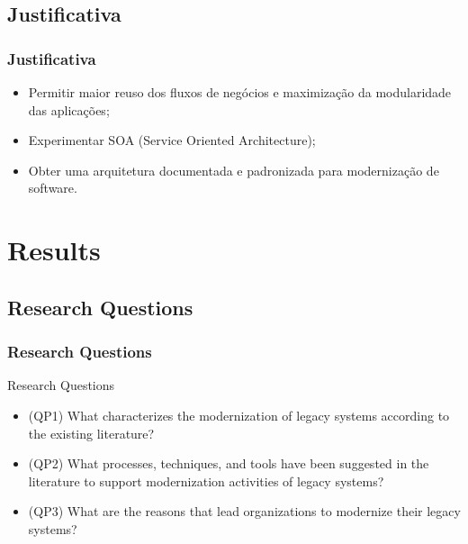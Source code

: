 \documentclass{beamer}
\begin{document}



\subsection{Justificativa}


\begin{frame}
  \frametitle{Justificativa}
  
    \begin{itemize}
       \item<1-> Permitir maior reuso dos fluxos de negócios e maximização da
modularidade das aplicações;
       \item<1-> Experimentar SOA (Service Oriented Architecture);
       \item<1-> Obter uma arquitetura documentada e padronizada para modernização de software.

				
    \end{itemize}
    
\end{frame}








\section{Results}


\subsection{Research Questions}


\begin{frame}
  \frametitle{Research Questions}

  \begin{exampleblock}{Research Questions}
  
	  \begin{itemize}
	    \item<1->(QP1) What characterizes the modernization of legacy 
	    				  systems according to the existing literature?
    	\item<2->(QP2) What processes, techniques, and tools have been
				   suggested in the literature to support modernization
				   activities of legacy systems?
		\item<3->(QP3) What are the reasons that lead organizations to 
					  modernize their legacy systems?
	  \end{itemize}
  
  \end{exampleblock}

  
\end{frame}
\end{document}
